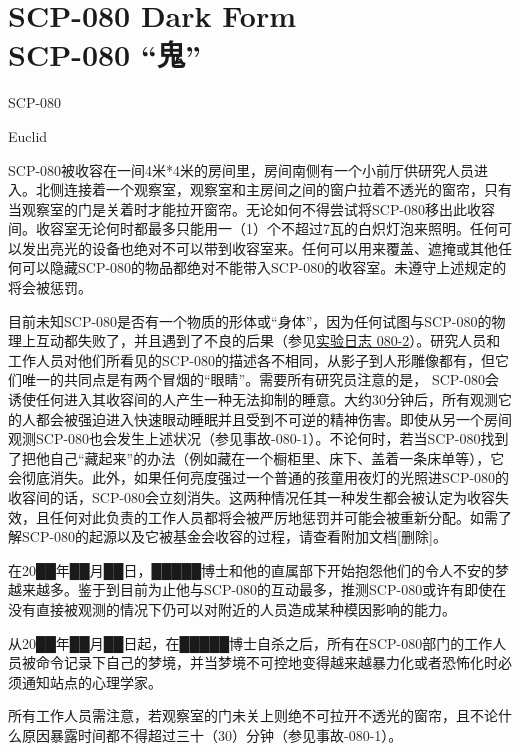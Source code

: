 \chapter[SCP-080 “鬼”]{
    SCP-080 Dark Form\\
    SCP-080 “鬼”
}

\label{chap:SCP-080}

SCP-080

Euclid

SCP-080被收容在一间4米*4米的房间里，房间南侧有一个小前厅供研究人员进入。北侧连接着一个观察室，观察室和主房间之间的窗户拉着不透光的窗帘，只有当观察室的门是关着时才能拉开窗帘。无论如何不得尝试将SCP-080移出此收容间。收容室无论何时都最多只能用一（1）个不超过7瓦的白炽灯泡来照明。任何可以发出亮光的设备也绝对不可以带到收容室来。任何可以用来覆盖、遮掩或其他任何可以隐藏SCP-080的物品都绝对不能带入SCP-080的收容室。未遵守上述规定的将会被惩罚。

目前未知SCP-080是否有一个物质的形体或“身体”，因为任何试图与SCP-080的物理上互动都失败了，并且遇到了不良的后果（参见\hyperref[sec:DOC-experiment-log-080-2]{实验日志 080-2}）。研究人员和工作人员对他们所看见的SCP-080的描述各不相同，从影子到人形雕像都有，但它们唯一的共同点是有两个冒烟的“眼睛”。需要所有研究员注意的是， SCP-080会诱使任何进入其收容间的人产生一种无法抑制的睡意。大约30分钟后，所有观测它的人都会被强迫进入快速眼动睡眠并且受到不可逆的精神伤害。即使从另一个房间观测SCP-080也会发生上述状况（参见事故-080-1）。不论何时，若当SCP-080找到了把他自己“藏起来”的办法（例如藏在一个橱柜里、床下、盖着一条床单等），它会彻底消失。此外，如果任何亮度强过一个普通的孩童用夜灯的光照进SCP-080的收容间的话，SCP-080会立刻消失。这两种情况任其一种发生都会被认定为收容失效，且任何对此负责的工作人员都将会被严厉地惩罚并可能会被重新分配。如需了解SCP-080的起源以及它被基金会收容的过程，请查看附加文档{[}删除]。

在20██年██月██日，█████博士和他的直属部下开始抱怨他们的令人不安的梦越来越多。鉴于到目前为止他与SCP-080的互动最多，推测SCP-080或许有即使在没有直接被观测的情况下仍可以对附近的人员造成某种模因影响的能力。

从20██年██月██日起，在█████博士自杀之后，所有在SCP-080部门的工作人员被命令记录下自己的梦境，并当梦境不可控地变得越来越暴力化或者恐怖化时必须通知站点的心理学家。

所有工作人员需注意，若观察室的门未关上则绝不可拉开不透光的窗帘，且不论什么原因暴露时间都不得超过三十（30）分钟（参见事故-080-1）。

